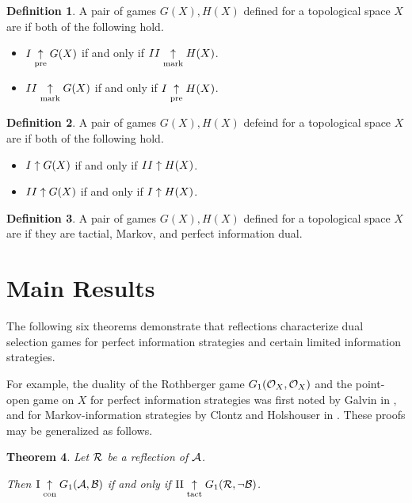 \documentclass{amsart}
\theoremstyle{plain}
\newtheorem{theorem}{Theorem}
\theoremstyle{definition}
\newtheorem{definition}[theorem]{Definition}
\theoremstyle{remark}
\theoremstyle{plain}
\theoremstyle{definition}
\theoremstyle{remark}
\begin{document}
\begin{definition}
  A pair of games \(G(X),H(X)\) defined for a topological space \(X\)
  are  if both
  of the following hold.
  \begin{itemize}
    \item \(I\underset{\text{pre}}{\uparrow} G(X)\) if and only if \(II\underset{\text{mark}}{\uparrow} H(X)\).
    \item \(II\underset{\text{mark}}{\uparrow} G(X)\) if and only if \(I\underset{\text{pre}}{\uparrow} H(X)\).
  \end{itemize}
\end{definition}

\begin{definition}
  A pair of games \(G(X),H(X)\) defeind for a topological space \(X\)
  are  if both
  of the following hold.
  \begin{itemize}
    \item \(I\uparrow G(X)\) if and only if \(II\uparrow H(X)\).
    \item \(II\uparrow G(X)\) if and only if \(I\uparrow H(X)\).
  \end{itemize}
\end{definition}

\begin{definition}
  A pair of games \(G(X),H(X)\) defined for a topological space \(X\)
  are  if they are tactial, Markov, and perfect information
  dual.
\end{definition}

\section{Main Results}

The following six theorems demonstrate that reflections characterize
dual selection games for perfect information strategies and
certain limited information strategies.

For example,
the duality of the Rothberger game \(G_{1}(\mathcal{O}_X,\mathcal{O}_X)\)
and the point-open game on \(X\) for perfect information strategies
was first noted by Galvin in \cite{MR0493925}, and
for Markov-information strategies by Clontz and Holshouser in
\cite{CLONTZ2019106815}. These proofs may be generalized as follows.

\begin{theorem}
  Let \(\mathcal{R}\) be a reflection of \(\mathcal{A}\). 

  Then
  \(\mathrm{I}\underset{\text{con}}{\uparrow}G_{1}(\mathcal{A},\mathcal{B})\) if and only if
  \(\mathrm{II}\underset{\text{tact}}{\uparrow}G_{1}(\mathcal{R},\neg\mathcal{B})\).
\end{theorem}
\end{document}
